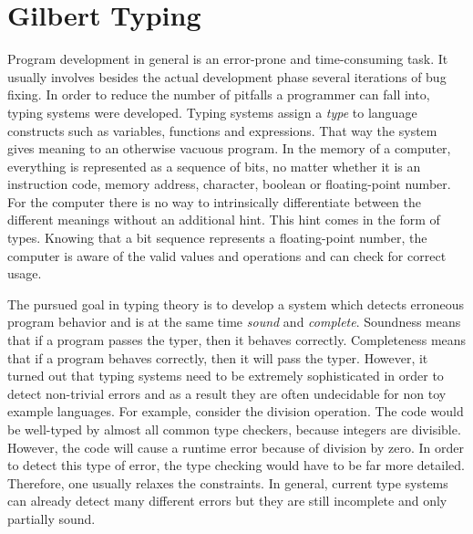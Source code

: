 \chapter{Gilbert Typing}
\label{cha:gilberttyping}

Program development in general is an error-prone and time-consuming task.
It usually involves besides the actual development phase several iterations of bug fixing.
In order to reduce the number of pitfalls a programmer can fall into, typing systems were developed.
Typing systems assign a \emph{type} to language constructs such as variables, functions and expressions.
That way the system gives meaning to an otherwise vacuous program.
In the memory of a computer, everything is represented as a sequence of bits, no matter whether it is an instruction code, memory address, character, boolean or floating-point number.
For the computer there is no way to intrinsically differentiate between the different meanings without an additional hint.
This hint comes in the form of types.
Knowing that a bit sequence represents a floating-point number, the computer is aware of the valid values and operations and can check for correct usage.

The pursued goal in typing theory is to develop a system which detects erroneous program behavior and is at the same time \emph{sound} and \emph{complete}.
Soundness means that if a program passes the typer, then it behaves correctly.
Completeness means that if a program behaves correctly, then it will pass the typer.
However, it turned out that typing systems need to be extremely sophisticated in order to detect non-trivial errors and as a result they are often undecidable for non toy example languages.
For example, consider the division operation.
The code  would be well-typed by almost all common type checkers, because integers are divisible.
However, the code will cause a runtime error because of division by zero.
In order to detect this type of error, the type checking would have to be far more detailed.
Therefore, one usually relaxes the constraints.
In general, current type systems can already detect many different errors but they are still incomplete and only partially sound.

